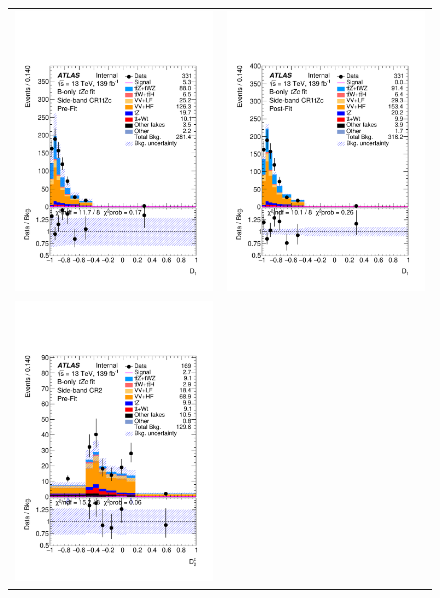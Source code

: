 \begin{figure}[htbp]
	\centering
	\begin{tabular}{cc}
		\includegraphics[width=.45\textwidth]{Chapters/CH8/figures/BONLY_CRSR_DL1rc_unblind/Plots/SBCR1} &
		\includegraphics[width=.45\textwidth]{Chapters/CH8/figures/BONLY_CRSR_DL1rc_unblind/Plots/SBCR1_postFit} \\
		\includegraphics[width=.45\textwidth]{Chapters/CH8/figures/BONLY_CRSR_DL1rc_unblind/Plots/SBCR2} &

\end{tabular}
\end{figure}
